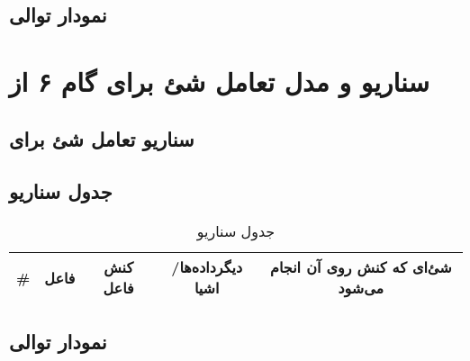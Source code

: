 \subsection{نمودار توالی}


\clearpage
\section{سناریو و مدل تعامل شئ برای گام ۶ از }
\subsection{سناریو تعامل شئ برای }
\subsection{جدول سناریو}
\begin{table}[H]
	\caption{جدول سناریو }
	\begin{adjustbox}{width=\textwidth}
		\begin{tabular}{|c|c|c|c|c|}
			\hline								
			\# & فاعل & کنش فاعل & دیگرداده‌ها/اشیا & شئ‌ای که کنش روی آن انجام می‌شود \\
			\hline
			\hline
		\end{tabular}
	\end{adjustbox}
\end{table}
\setcounter{MainStepCounter}{0}
\setcounter{SenarioCounter}{0}
\subsection{نمودار توالی}
